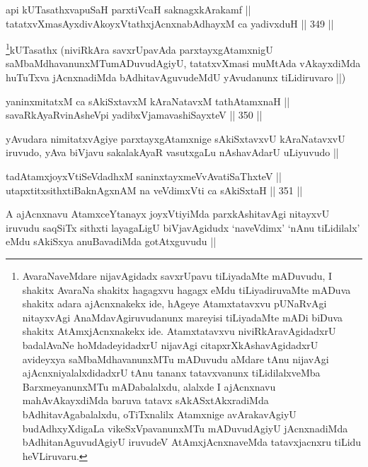 \begin{shl}
api kUTasathxvapuSaH parxtiVcaH saknagxkArakamf || \\
tatatxvXmasAyxdivAkoyxVtathxjAcnxnabAdhayxM ca yadivxduH ||  349 ||  
\end{shl}

\begin{artha}
\footnote{AvaraNaveMdare nijavAgidadx savxrUpavu tiLiyadaMte mADuvudu, I shakitx AvaraNa shakitx hagagxvu hagagx eMdu tiLiyadiruvaMte mADuva shakitx adara ajAcnxnakekx ide, hAgeye Atamxtatavxvu pUNaRvAgi nitayxvAgi AnaMdavAgiruvudanunx mareyisi tiLiyadaMte mADi biDuva shakitx AtAmxjAcnxnakekx ide. Atamxtatavxvu niviRkAravAgidadxrU badalAvaNe hoMdadeyidadxrU nijavAgi citapxrXkAshavAgidadxrU avideyxya saMbaMdhavanunxMTu mADuvudu aMdare tAnu nijavAgi ajAcnxniyalalxdidadxrU tAnu tananx tatavxvanunx tiLidilalxveMba BarxmeyanunxMTu mADabalalxdu, alalxde I ajAcnxnavu mahAvAkayxdiMda baruva tatavx sAkASxtAkxradiMda bAdhitavAgabalalxdu, oTiTxnalilx Atamxnige avArakavAgiyU budAdhxyXdigaLa vikeSxVpavanunxMTu mADuvudAgiyU jAcnxnadiMda bAdhitanAguvudAgiyU iruvudeV AtAmxjAcnxnaveMda tatavxjacnxru tiLidu heVLiruvaru.}kUTasathx (niviRkAra savxrUpavAda parxtayxgAtamxnigU saMbaMdhavanunxMTumADuvudAgiyU, tatatxvXmasi muMtAda vAkayxdiMda huTuTxva jAcnxnadiMda bAdhitavAguvudeMdU yAvudanunx tiLidiruvaro ||)
\end{artha}

\begin{shl}
yaninxmitatxM ca sAkiSxtavxM kAraNatavxM tathA\s \s tamxnaH || \\
savaRkAyaRvinAsheV\s pi yadibxVjamavashiSayxteV ||  350 ||  
\end{shl}

\begin{artha}
yAvudara nimitatxvAgiye parxtayxgAtamxnige sAkiSxtavxvU kAraNatavxvU iruvudo, yAva biVjavu sakalakAyaR vasutxgaLu nAshavAdarU uLiyuvudo ||
\end{artha}

\begin{shl}
tadAtamxjoyxVtiSeVdadhxM saninxtayxmeVvAvatiSaThxteV || \\
utapxtitxsithxtiBaknAgxnAM na veVdimxVti ca sAkiSxtaH ||  351 ||  
\end{shl}

\begin{artha}
A ajAcnxnavu AtamxceYtanayx joyxVtiyiMda parxkAshitavAgi nitayxvU iruvudu saqSiTx sithxti layagaLigU biVjavAgidudx `naveVdimx' `nAnu tiLidilalx' eMdu sAkiSxya anuBavadiMda gotAtxguvudu ||
\end{artha}

